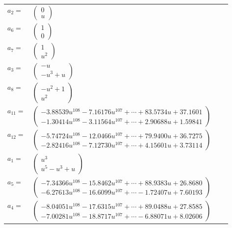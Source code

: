\documentclass[1p]{elsarticle_modified}
\theoremstyle{definition}
\begin{document}
\begin{tabular}{m{7pt} m{180pt} m{7pt} m{180pt} }
\flushright $a_{2}=$&$\begin{pmatrix}0\\u\end{pmatrix}$ \\
\flushright $a_{6}=$&$\begin{pmatrix}1\\0\end{pmatrix}$ \\
\flushright $a_{7}=$&$\begin{pmatrix}1\\u^2\end{pmatrix}$ \\
\flushright $a_{3}=$&$\begin{pmatrix}- u\\- u^3+u\end{pmatrix}$ \\
\flushright $a_{8}=$&$\begin{pmatrix}- u^2+1\\u^2\end{pmatrix}$ \\
\flushright $a_{11}=$&$\begin{pmatrix}-3.88539 u^{108}-7.16176 u^{107}+\cdots+83.5734 u+37.1601\\-1.30414 u^{108}-3.11564 u^{107}+\cdots+2.90688 u+1.59841\end{pmatrix}$ \\
\flushright $a_{12}=$&$\begin{pmatrix}-5.74724 u^{108}-12.0466 u^{107}+\cdots+79.9400 u+36.7275\\-2.82416 u^{108}-7.12730 u^{107}+\cdots+4.15601 u+3.73114\end{pmatrix}$ \\
\flushright $a_{1}=$&$\begin{pmatrix}u^3\\u^5- u^3+u\end{pmatrix}$ \\
\flushright $a_{5}=$&$\begin{pmatrix}-7.34366 u^{108}-15.8462 u^{107}+\cdots+88.9383 u+26.8680\\-6.27613 u^{108}-16.6099 u^{107}+\cdots-1.72407 u+7.60193\end{pmatrix}$ \\
\flushright $a_{4}=$&$\begin{pmatrix}-8.04051 u^{108}-17.6315 u^{107}+\cdots+89.0488 u+27.8585\\-7.00281 u^{108}-18.8717 u^{107}+\cdots-6.88071 u+8.02606\end{pmatrix}$ \\

\end{tabular}
\end{document}
